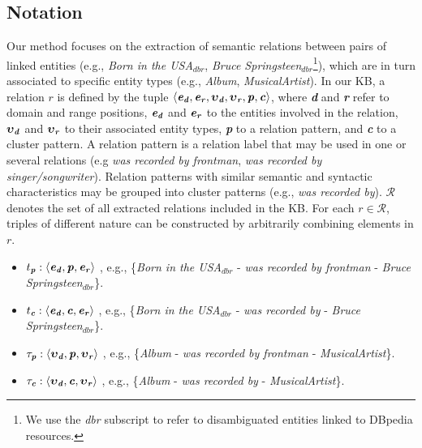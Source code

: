 \subsection{Notation}

Our method focuses on the extraction of semantic relations between pairs of linked entities (e.g., \textit{Born in the USA}$_{dbr}$, \textit{Bruce Springsteen}$_{dbr}$\footnote{We use the \textit{dbr} subscript to refer to disambiguated entities linked to DBpedia resources.}), which are in turn associated to specific entity types (e.g., \textit{Album}, \textit{MusicalArtist}). In our KB, a relation $r$ is defined by the tuple $\langle \textbf{\textit{e}}{_\textbf{\textit{d}}},
\textbf{\textit{e}}{_\textbf{\textit{r}}},
\boldsymbol\upsilon{_\textbf{\textit{d}}},
\boldsymbol\upsilon{_\textbf{\textit{r}}},
\textbf{\textit{p}}, \textbf{\textit{c}}\rangle$, where \textbf{\textit{d}} and \textbf{\textit{r}} refer to domain and range positions, $\textbf{\textit{e}}{_\textbf{\textit{d}}}$ and $\textbf{\textit{e}}{_\textbf{\textit{r}}}$ to the entities involved in the relation, $\boldsymbol\upsilon{_\textbf{\textit{d}}}$ and
$\boldsymbol\upsilon{_\textbf{\textit{r}}}$ to their associated entity types, \textbf{\textit{p}} to a relation pattern, and \textbf{\textit{c}} to a cluster pattern.  
A relation pattern is a relation label that may be used in one or several relations (e.g \textit{was recorded by frontman}, \textit{was recorded by singer/songwriter}). Relation patterns with similar semantic and syntactic characteristics may be grouped into cluster patterns (e.g., \textit{was recorded by}). 
$\mathcal{R}$ denotes the set of all extracted relations included in the KB.
For each $r \in \mathcal{R}$, triples of different nature can be constructed by arbitrarily combining elements in $r$.

\begin{itemize}
    \item $t_\textbf{\textit{p}}: \langle \textbf{\textit{e}}{_\textbf{\textit{d}}},\textbf{\textit{p}},\textbf{\textit{e}}{_\textbf{\textit{r}}} \rangle$ , e.g., \{\textit{Born in the USA}$_{dbr}$ - \textit{was recorded by frontman} - \textit{Bruce Springsteen}$_{dbr}$\}.
    \item $t_\textbf{\textit{c}}: \langle \textbf{\textit{e}}{_\textbf{\textit{d}}},\textbf{\textit{c}},\textbf{\textit{e}}{_\textbf{\textit{r}}} \rangle$ , e.g., \{\textit{Born in the USA}$_{dbr}$ - \textit{was recorded by} - \textit{Bruce Springsteen}$_{dbr}$\}.
    \item $\tau_\textbf{\textit{p}}: \langle \boldsymbol\upsilon{_\textbf{\textit{d}}},\textbf{\textit{p}},\boldsymbol\upsilon{_\textbf{\textit{r}}} \rangle$ , e.g., \{\textit{Album} - \textit{was recorded by frontman} - \textit{MusicalArtist}\}.
    \item $\tau_\textbf{\textit{c}}: \langle \boldsymbol\upsilon{_\textbf{\textit{d}}},\textbf{\textit{c}},\boldsymbol\upsilon{_\textbf{\textit{r}}} \rangle$ , e.g., \{\textit{Album} - \textit{was recorded by} - \textit{MusicalArtist}\}.
\end{itemize}

